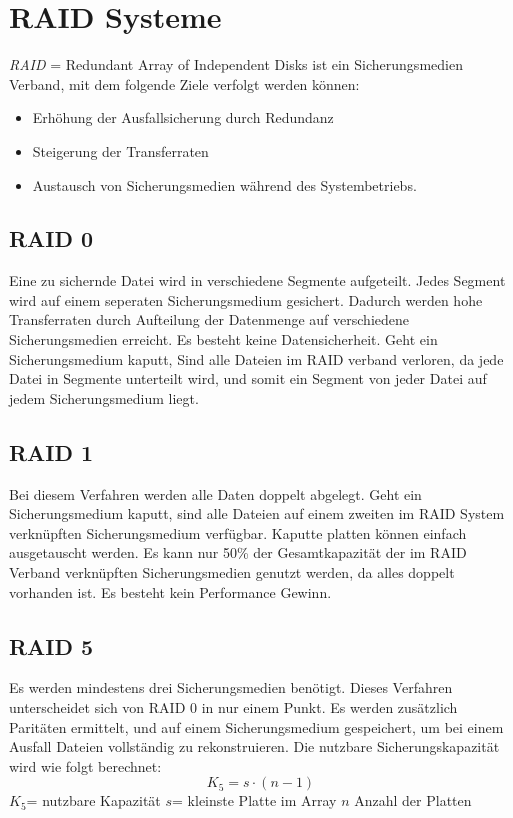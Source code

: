 \documentclass[12pt,a4paper]{article}
\begin{document}
\section{RAID Systeme}
\textit{RAID} = Redundant Array of Independent Disks\newline
ist ein Sicherungsmedien Verband, mit dem folgende Ziele verfolgt werden können:
\begin{itemize}
\item Erhöhung der Ausfallsicherung durch Redundanz
\item Steigerung der Transferraten
\item Austausch von Sicherungsmedien während des Systembetriebs.
\end{itemize}
\subsection{RAID 0}
Eine zu sichernde Datei wird in verschiedene Segmente aufgeteilt. Jedes Segment wird auf einem seperaten Sicherungsmedium gesichert. Dadurch werden hohe Transferraten durch Aufteilung der Datenmenge auf verschiedene Sicherungsmedien erreicht. Es besteht keine Datensicherheit. Geht ein Sicherungsmedium kaputt, Sind alle Dateien im RAID verband verloren, da jede Datei in Segmente unterteilt wird, und somit ein Segment von jeder Datei auf jedem Sicherungsmedium liegt.
\subsection{RAID 1}
Bei diesem Verfahren werden alle Daten doppelt abgelegt. Geht ein Sicherungsmedium kaputt, sind alle Dateien auf einem zweiten im RAID System verknüpften Sicherungsmedium verfügbar. Kaputte platten können einfach ausgetauscht werden. Es kann nur 50\% der Gesamtkapazität der im RAID Verband verknüpften Sicherungsmedien genutzt werden, da alles doppelt vorhanden ist. Es besteht kein Performance Gewinn.
\subsection{RAID 5}
Es werden mindestens drei Sicherungsmedien benötigt. Dieses Verfahren unterscheidet sich von RAID 0 in nur einem Punkt. Es werden zusätzlich Paritäten ermittelt, und auf einem Sicherungsmedium gespeichert, um bei einem Ausfall Dateien vollständig zu rekonstruieren. \newline
Die nutzbare Sicherungskapazität wird wie folgt berechnet:
\begin{equation*}
K_5 = s\cdot (n-1)
\end{equation*}
$K_5$= nutzbare Kapazität \hspace{1.5cm} $s$= kleinste Platte im Array \hspace{1.5cm} $n$ Anzahl der Platten
\end{document}
